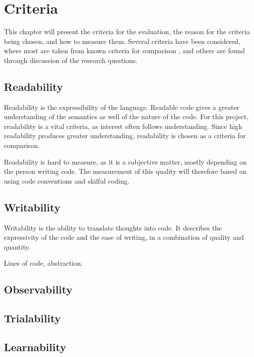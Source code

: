 \chapter{Criteria}
\label{chap:criteria}

This chapter will present the criteria for the evaluation, the reason for the criteria being chosen, and how to measure them. Several criteria have been considered, where most are taken from known criteria for comparison \cite{design_criteria1} \cite{design_criteria2}, and others are found through discussion of the research questions.

\section{Readability}
Readability is the expressibility of the language. Readable code gives a greater understanding of the semantics as well of the nature of the code. For this project, readability is a vital criteria, as interest often follows understanding. Since high readability produces greater understanding, readability is chosen as a criteria for comparison.

Readability is hard to measure, as it is a subjective matter, mostly depending on the person writing code. The measurement of this quality will therefore based on using code conventions and skilful coding.

\section{Writability}
Writability is the ability to translate thoughts into code. It describes the expressivity of the code and the ease of writing, in a combination of quality and quantity.

Lines of code, abstraction.

\section{Observability}


\section{Trialability}


\section{Learnability}


